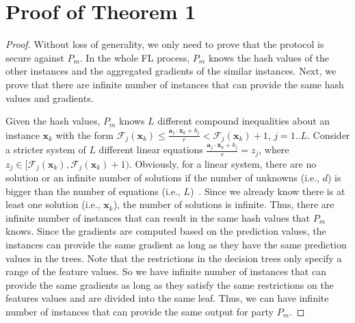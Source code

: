 \documentclass[letterpaper]{article} %
\theoremstyle{definition}
\begin{document}
\section{Proof of Theorem 1}
\begin{proof}
Without loss of generality, we only need to prove that the protocol is secure against $P_m$. In the whole FL process, $P_m$ knows the hash values of the other instances and the aggregated gradients of the similar instances. Next, we prove that there are infinite number of instances that can provide the same hash values and gradients.

Given the hash values, $P_m$ knows $L$ different compound inequalities about an instance $\mathbf{x}_k$ with the form $\mathcal{F}_j(\mathbf{x}_k) \leq \frac{\mathbf{a}_j\cdot\mathbf{x}_k+b_j}{r} < \mathcal{F}_j(\mathbf{x}_k) + 1$, $j=1..L$. Consider a stricter system of $L$ different linear equations $\frac{\mathbf{a}_j\cdot\mathbf{x}_k+b_j}{r} = z_j$, where $z_j\in [\mathcal{F}_j(\mathbf{x}_k),\mathcal{F}_j(\mathbf{x}_k) + 1)$. Obviously, for a linear system, there are no solution or an infinite number of solutions if the number of unknowns (i.e., $d$) is bigger than the number of equations (i.e., $L$)~\cite{ladyzhenskaia1968linear}. Since we already know there is at least one solution (i.e., $\mathbf{x}_k$), the number of solutions is infinite. Thus, there are infinite number of instances that can result in the same hash values that $P_m$ knows. Since the gradients are computed based on the prediction values, the instances can provide the same gradient as long as they have the same prediction values in the trees. Note that the restrictions in the decision trees only specify a range of the feature values. So we have infinite number of instances that can provide the same gradients as long as they satisfy the same restrictions on the features values and are divided into the same leaf. Thus, we can have infinite number of instances that can provide the same output for party $P_m$.
\end{proof}
\end{document}
